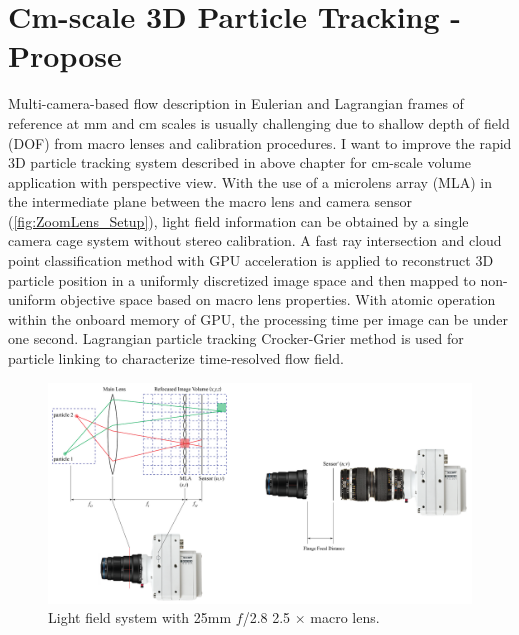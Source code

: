 \documentclass[draftthesis,fullpage]{uiucthesis}
\begin{document}
\chapter{Cm-scale 3D Particle Tracking - Propose}\label{chapter:cm}
Multi-camera-based flow description in Eulerian and Lagrangian frames of reference at mm and cm scales is usually challenging due to shallow depth of field (DOF) from macro lenses and calibration procedures. I want to improve the rapid 3D particle tracking system described in above chapter for cm-scale volume application with perspective view. With the use of a microlens array (MLA) in the intermediate plane between the macro lens and camera sensor (\autoref{fig:ZoomLens_Setup}), light field information can be obtained by a single camera cage system without stereo calibration. A fast ray intersection and cloud point classification method with GPU acceleration is applied to reconstruct 3D particle position in a uniformly discretized image space and then mapped to non-uniform objective space based on macro lens properties. With atomic operation within the onboard memory of GPU, the processing time per image can be under one second. Lagrangian particle tracking Crocker-Grier method is used for particle linking to characterize time-resolved flow field.

\begin{figure}[h]
  \centerline{\includegraphics[width = 0.7\linewidth]{fig/ZoomLens_Setup.png}} 
  \caption{Light field system with 25mm $f$/2.8 2.5 $\times$ macro lens. 
  }
\label{fig:ZoomLens_Setup}
\end{figure}
\end{document}

